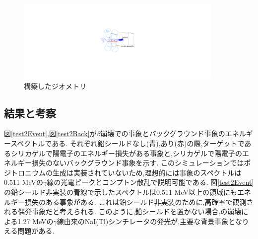 \begin{figure}[!tbp]
	\centering
		\includegraphics[width=10cm]{img/test2_geometry.pdf}
	\caption{構築したジオメトリ}
	\label{test2_geometry}
\end{figure}

\subsection{結果と考察}

図\ref{test2Event},図\ref{test2Back}が$\beta$崩壊での事象とバックグラウンド事象のエネルギースペクトルである.
それぞれ鉛シールドなし(青),あり(赤)の際,ターゲットであるシリカゲルで陽電子のエネルギー損失がある事象と,シリカゲルで陽電子のエネルギー損失のないバックグラウンド事象を示す.
このシミュレーションではポジトロニウムの生成は実装されていないため,理想的には事象のスペクトルは0.511 MeVの$\gamma$線の光電ピークとコンプトン散乱で説明可能である.
図\ref{test2Event}の鉛シールド非実装の青線で示したスペクトルは0.511 MeV以上の領域にもエネルギー損失のある事象がある.
これは鉛シールド非実装のために,高確率で観測される偶発事象だと考えられる.
このように,鉛シールドを置かない場合,の崩壊による1.27 MeVの$\gamma$線由来のNaI(Tl)シンチレータの発光が,主要な背景事象となりえる問題がある.


